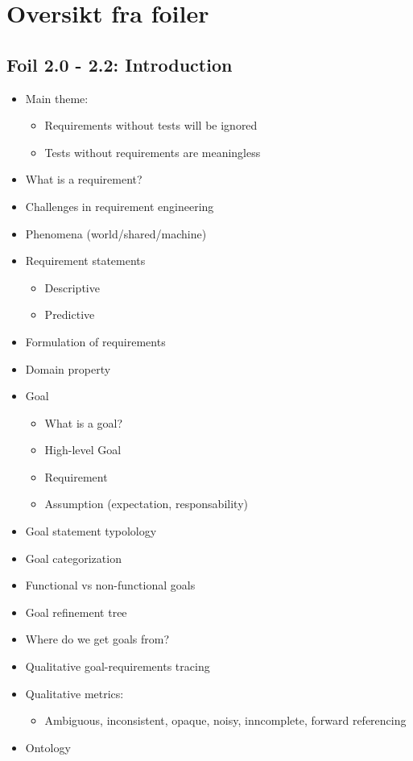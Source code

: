 \chapter{Oversikt fra foiler}
	


	\section{Foil 2.0 - 2.2: Introduction}
		\begin{itemize}
			\item Main theme:
				\begin{itemize}
					\item Requirements without tests will be ignored
					\item Tests without requirements are meaningless
				\end{itemize}
			\item What is a requirement?
			\item Challenges in requirement engineering
			\item Phenomena (world/shared/machine)
			\item Requirement statements
				\begin{itemize}
					\item Descriptive
					\item Predictive
				\end{itemize}
			\item Formulation of requirements
			\item Domain property
			\item Goal
				\begin{itemize}
					\item What is a goal?
					\item High-level Goal
					\item Requirement
					\item Assumption (expectation, responsability)
				\end{itemize}
			\item Goal statement typolology
			\item Goal categorization
			\item Functional vs non-functional goals
			\item Goal refinement tree
			\item Where do we get goals from?
			\item Qualitative goal-requirements tracing
			\item Qualitative metrics:
				\begin{itemize}
					\item Ambiguous, inconsistent, opaque, noisy, inncomplete, forward referencing
				\end{itemize}
			\item Ontology
		\end{itemize}



